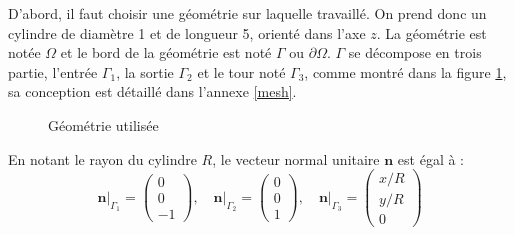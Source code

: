 D'abord, il faut choisir une géométrie sur laquelle travaillé. On prend donc un cylindre de diamètre 1 et de longueur 5, orienté dans l'axe $z$. La géométrie est notée $\Omega$ et le bord de la géométrie est noté $\Gamma$ ou $\partial\Omega$. $\Gamma$ se décompose en trois partie, l'entrée $\Gamma_1$,  la sortie $\Gamma_2$ et le tour noté $\Gamma_3$, comme montré dans la figure \ref{figMesh}, sa conception est détaillé dans l'annexe \ref{mesh}.\\
\begin{figure}[H]
\centering
{}
\caption{Géométrie utilisée}
\label{figMesh}
\end{figure}
En notant le rayon du cylindre $R$, le vecteur normal unitaire $\mathbf{n}$ est égal à :
\[ \mathbf{n}\big\rvert_{\Gamma_1}=\begin{pmatrix}0\\0\\-1\end{pmatrix},\quad \mathbf{n}\big\rvert_{\Gamma_2}=\begin{pmatrix}0\\0\\1\end{pmatrix},\quad \mathbf{n}\big\rvert_{\Gamma_3}=\begin{pmatrix}
x/R\\y/R\\0\end{pmatrix} \]
